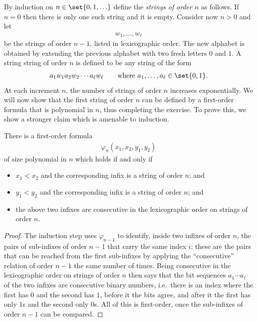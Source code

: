 {
By induction on  $n \in \set{0,1,\ldots}$ define the \emph{strings of order $n$} as follows. If $n=0$ then there is only one such string and it is empty. Consider now $n>0$ and let 
    \begin{align*}
    w_1,\ldots,w_\ell
    \end{align*}
    be the strings of order $n-1$, listed in lexicographic order.  The new alphabet is obtained by extending the previous alphabet with two fresh letters $0$ and $1$. A string  string of order $n$ is defined to be any string of the form 
    \begin{align*}
    a_1 w_1 a_2 w_2 \cdots a_\ell w_\ell  \qquad \text{where $a_1,\ldots,a_\ell \in \set{0,1}$}.
    \end{align*}
    At each increment $n$, the number of strings of order $n$ increases exponentially. We will now show that the first string of order $n$ can be defined by a first-order formula that is polynomial in $n$, thus completing the exercise. To prove this, we show a stronger claim which is amenable to induction. 
    \begin{claim}
        There is a first-order formula 
        \begin{align*}
            \varphi_n(x_1,x_2,y_1,y_2)
        \end{align*}
        of size polynomial in $n$ which holds if and only if
        \begin{itemize}
            \item $x_1 < x_2$ and the corresponding infix is a string of order $n$; and 
            \item $y_1 < y_2$ and the corresponding infix is a string of order $n$; and
            \item the  above two infixes  are consecutive in the lexicographic order on strings of order $n$.
        \end{itemize}
    \end{claim}
    \begin{proof}
        The induction step uses $\varphi_{n-1}$ to identify, inside two infixes of order $n$, the pairs of sub-infixes of order $n-1$ that carry the same index $i$: these are the pairs that can be reached from the first sub-infixes by applying the ``consecutive'' relation of order $n-1$ the same number of times. Being consecutive in the lexicographic order on strings of order $n$ then says that the bit sequences $a_1 \cdots a_\ell$ of the two infixes are consecutive binary numbers, i.e.~there is an index where the first has $0$ and the second has $1$, before it the bits agree, and after it the first has only $1$s and the second only $0$s. All of this is first-order, once the sub-infixes of order $n-1$ can be compared.


\end{proof}}
